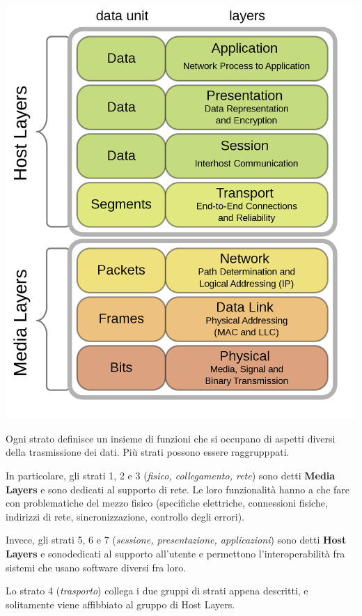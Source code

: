         \begin{center}
            \includegraphics[scale=0.25]{images/OSI.png}
        \end{center}
        
        Ogni strato definisce un insieme di funzioni che si occupano di aspetti diversi della trasmissione dei dati. Più strati possono essere raggrupppati.
        
        In particolare, gli strati 1, 2 e 3 (\textit{fisico, collegamento, rete}) sono detti \textbf{Media Layers} e sono dedicati al supporto di rete. Le loro funzionalità hanno a che fare con problematiche del mezzo fisico (specifiche elettriche, connessioni fisiche, indirizzi di rete, sincronizzazione, controllo degli errori).
        
        Invece, gli strati 5, 6 e 7 (\textit{sessione, presentazione, applicazioni}) sono detti \textbf{Host Layers} e sonodedicati al supporto all'utente e permettono l'interoperabilità fra sistemi che usano software diversi fra loro. 
        
        Lo strato 4 (\textit{trasporto}) collega i due gruppi di strati appena descritti, e solitamente viene affibbiato al gruppo di Host Layers.
        
